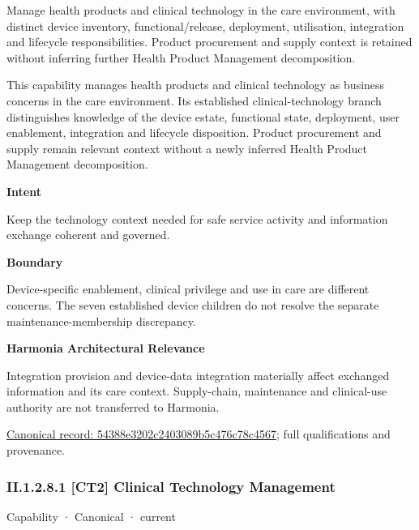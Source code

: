 Manage health products and clinical technology in the care environment, with distinct device inventory, functional/release, deployment, utilisation, integration and lifecycle responsibilities. Product procurement and supply context is retained without inferring further Health Product Management decomposition.



This capability manages health products and clinical technology as business concerns in the care environment. Its established clinical-technology branch distinguishes knowledge of the device estate, functional state, deployment, user enablement, integration and lifecycle disposition. Product procurement and supply remain relevant context without a newly inferred Health Product Management decomposition.



\textbf{Intent}



Keep the technology context needed for safe service activity and information exchange coherent and governed.



\textbf{Boundary}



Device-specific enablement, clinical privilege and use in care are different concerns. The seven established device children do not resolve the separate maintenance-membership discrepancy.



\textbf{Harmonia Architectural Relevance}



Integration provision and device-data integration materially affect exchanged information and its care context. Supply-chain, maintenance and clinical-use authority are not transferred to Harmonia.


{\footnotesize \href{../../../../continuum/strategy/capability/54388e3202c2403089b5c476c78c4567.md}{Canonical record: 54388e3202c2403089b5c476c78c4567}; full qualifications and provenance.}\par
\subsubsection*{II.1.2.8.1 [CT2] Clinical Technology Management}
\label{navigation:II.1.2.8.1}

\label{element:6c91476a45eb4432b1f90b47a4c2ad35}
{\small Capability · Canonical · current}\par


